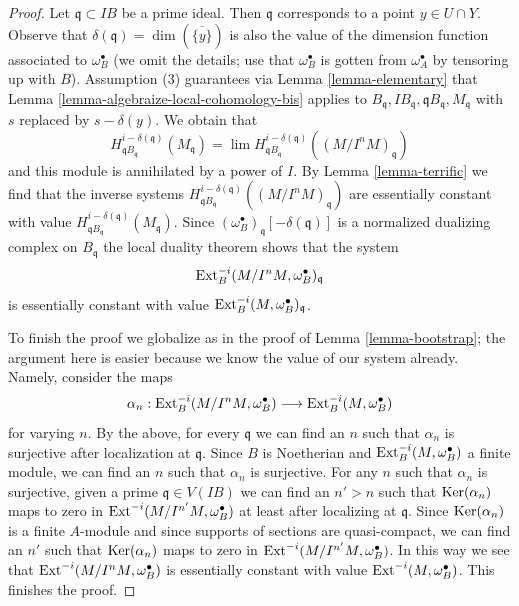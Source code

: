 \begin{proof}
\medskip\noindent
Let $\mathfrak q \subset IB$ be a prime ideal. Then $\mathfrak q$ corresponds
to a point $y \in U \cap Y$. Observe that
$\delta(\mathfrak q) = \dim(\overline{\{y\}})$
is also the value of the dimension function associated to $\omega_B^\bullet$
(we omit the details; use that $\omega_B^\bullet$ is gotten from
$\omega_A^\bullet$ by tensoring up with $B$). Assumption
(3) guarantees via Lemma \ref{lemma-elementary}
that Lemma \ref{lemma-algebraize-local-cohomology-bis}
applies to
$B_\mathfrak q, IB_\mathfrak q, \mathfrak qB_\mathfrak q, M_\mathfrak q$
with $s$ replaced by $s - \delta(y)$. We obtain that
$$
H^{i - \delta(\mathfrak q)}_{\mathfrak qB_\mathfrak q}(M_\mathfrak q) =
\lim H^{i - \delta(\mathfrak q)}_{\mathfrak qB_\mathfrak q}(
(M/I^nM)_\mathfrak q)
$$
and this module is annihilated by a power of $I$.
By Lemma \ref{lemma-terrific} we find that the inverse systems
$H^{i - \delta(\mathfrak q)}_{\mathfrak qB_\mathfrak q}((M/I^nM)_\mathfrak q)$
are essentially constant with value
$H^{i - \delta(\mathfrak q)}_{\mathfrak qB_\mathfrak q}(M_\mathfrak q)$.
Since $(\omega_B^\bullet)_\mathfrak q[-\delta(\mathfrak q)]$ is a normalized
dualizing complex on $B_\mathfrak q$ the local duality theorem
shows that the system
$$
\mathop{\mathrm{Ext}}\nolimits^{-i}_B(M/I^n M, \omega_B^\bullet)_\mathfrak q
$$
is essentially constant with value
$\mathop{\mathrm{Ext}}\nolimits^{-i}_B(M, \omega_B^\bullet)_\mathfrak q$.

\medskip\noindent
To finish the proof we globalize as in the proof of
Lemma \ref{lemma-bootstrap}; the argument here is easier
because we know the value of our system already. Namely, consider the maps
$$
\alpha_n :
\mathop{\mathrm{Ext}}\nolimits^{-i}_B(M/I^n M, \omega_B^\bullet)
\longrightarrow
\mathop{\mathrm{Ext}}\nolimits^{-i}_B(M, \omega_B^\bullet)
$$
for varying $n$. By the above, for every $\mathfrak q$ we can find an
$n$ such that $\alpha_n$ is surjective after localization at $\mathfrak q$.
Since $B$ is Noetherian and $\mathop{\mathrm{Ext}}\nolimits^{-i}_B(M, \omega_B^\bullet)$
a finite module, we can find an $n$ such that $\alpha_n$ is surjective.
For any $n$ such that $\alpha_n$ is surjective, given a prime
$\mathfrak q \in V(IB)$ we can find an $n' > n$ such that
$\mathop{\mathrm{Ker}}(\alpha_n)$ maps to zero in $\mathop{\mathrm{Ext}}\nolimits^{-i}(M/I^{n'}M, \omega_B^\bullet)$
at least after localizing at $\mathfrak q$.
Since $\mathop{\mathrm{Ker}}(\alpha_n)$ is a finite $A$-module and since supports of
sections are quasi-compact, we can find an $n'$ such that
$\mathop{\mathrm{Ker}}(\alpha_n)$ maps to zero in $\mathop{\mathrm{Ext}}\nolimits^{-i}(M/I^{n'}M, \omega_B^\bullet)$.
In this way we see that $\mathop{\mathrm{Ext}}\nolimits^{-i}(M/I^n M, \omega_B^\bullet)$
is essentially constant with value $\mathop{\mathrm{Ext}}\nolimits^{-i}(M, \omega_B^\bullet)$.
This finishes the proof.
\end{proof}

